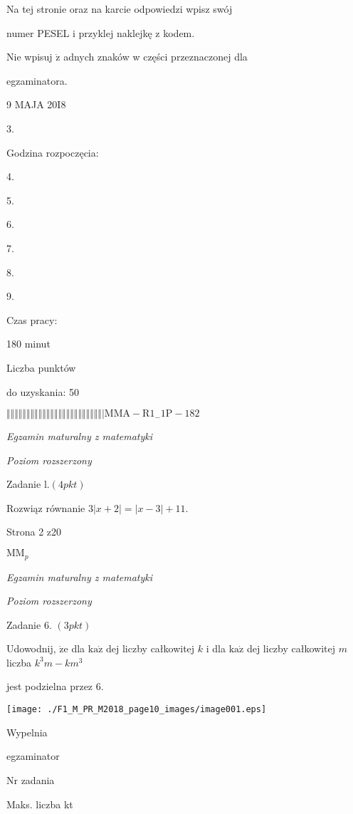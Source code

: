 \documentclass[a4paper,12pt]{article}
\begin{document}
Na tej stronie oraz na karcie odpowiedzi wpisz swój

numer PESEL i przyklej naklejkę z kodem.

Nie wpisuj $\dot{\mathrm{z}}$ adnych znaków w części przeznaczonej dla

egzaminatora.

9 MAJA 20I8

3.

Godzina rozpoczęcia:

4.

5.

6.

7.

8.

9.

Czas pracy:

180 minut

Liczba punktów

do uzyskania: 50

$\Vert\Vert\Vert\Vert\Vert\Vert\Vert\Vert\Vert\Vert\Vert\Vert\Vert\Vert\Vert\Vert\Vert\Vert\Vert\Vert\Vert\Vert\Vert\Vert|  \mathrm{M}\mathrm{M}\mathrm{A}-\mathrm{R}1_{-}1\mathrm{P}-182$




{\it Egzamin maturalny z matematyki}

{\it Poziom rozszerzony}

Zadanie l.$(4pkt)$

Rozwiąz równanie $3|x+2|=|x-3|+11.$

Strona 2 z20

$\mathrm{M}\mathrm{M}_{p}$





{\it Egzamin maturalny z matematyki}

{\it Poziom rozszerzony}

Zadanie 6. $(3pkt)$

Udowodnij, $\dot{\mathrm{z}}\mathrm{e}$ dla $\mathrm{k}\mathrm{a}\dot{\mathrm{z}}$ dej liczby całkowitej $k$ i dla $\mathrm{k}\mathrm{a}\dot{\mathrm{z}}$ dej liczby całkowitej $m$ liczba $k^{3}m-km^{3}$

jest podzielna przez 6.
\begin{center}
\texttt{[image: ./F1\_M\_PR\_M2018\_page10\_images/image001.eps]}
\end{center}
Wypelnia

egzaminator

Nr zadania

Maks. liczba kt
\end{document}

